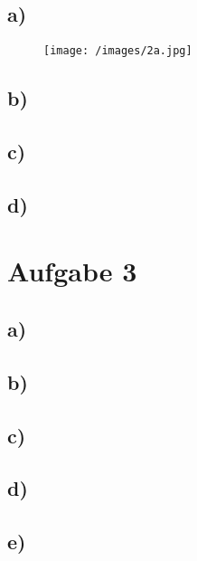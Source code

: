     \subsection{a)}

    \begin{figure}
        \centering
        \texttt{[image: /images/2a.jpg]}
        \label{fig:3}
    \end{figure}

    \subsection{b)}

    \subsection{c)}

    \subsection{d)}

\section{Aufgabe 3}

    \subsection{a)}

    \subsection{b)}

    \subsection{c)}

    \subsection{d)}

    \subsection{e)}

